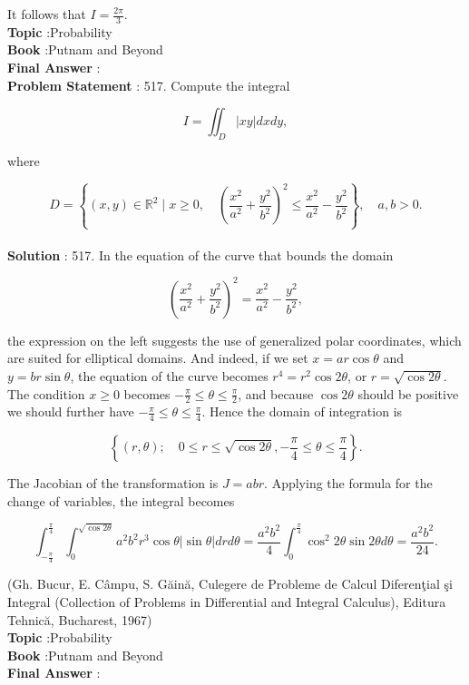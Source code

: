 \documentclass[10pt]{article}
\begin{document}
It follows that $I=\frac{2 \pi}{3}$.
\\
\textbf{Topic} :Probability\\
\textbf{Book} :Putnam and Beyond\\
\textbf{Final Answer} :\\


\textbf{Problem Statement} :
517. Compute the integral

$$
I=\iint_{D}|x y| d x d y,
$$

where

$$
D=\left\{(x, y) \in \mathbb{R}^{2} \mid x \geq 0, \quad\left(\frac{x^{2}}{a^{2}}+\frac{y^{2}}{b^{2}}\right)^{2} \leq \frac{x^{2}}{a^{2}}-\frac{y^{2}}{b^{2}}\right\}, \quad a, b>0 .
$$
\\
\textbf{Solution} :
517. In the equation of the curve that bounds the domain

$$
\left(\frac{x^{2}}{a^{2}}+\frac{y^{2}}{b^{2}}\right)^{2}=\frac{x^{2}}{a^{2}}-\frac{y^{2}}{b^{2}},
$$

the expression on the left suggests the use of generalized polar coordinates, which are suited for elliptical domains. And indeed, if we set $x=a r \cos \theta$ and $y=b r \sin \theta$, the equation of the curve becomes $r^{4}=r^{2} \cos 2 \theta$, or $r=\sqrt{\cos 2 \theta}$. The condition $x \geq 0$ becomes $-\frac{\pi}{2} \leq \theta \leq \frac{\pi}{2}$, and because $\cos 2 \theta$ should be positive we should further have $-\frac{\pi}{4} \leq \theta \leq \frac{\pi}{4}$. Hence the domain of integration is

$$
\left\{(r, \theta) ; \quad 0 \leq r \leq \sqrt{\cos 2 \theta},-\frac{\pi}{4} \leq \theta \leq \frac{\pi}{4}\right\} .
$$

The Jacobian of the transformation is $J=a b r$. Applying the formula for the change of variables, the integral becomes

$$
\int_{-\frac{\pi}{4}}^{\frac{\pi}{4}} \int_{0}^{\sqrt{\cos 2 \theta}} a^{2} b^{2} r^{3} \cos \theta|\sin \theta| d r d \theta=\frac{a^{2} b^{2}}{4} \int_{0}^{\frac{\pi}{4}} \cos ^{2} 2 \theta \sin 2 \theta d \theta=\frac{a^{2} b^{2}}{24} .
$$

(Gh. Bucur, E. Câmpu, S. Găină, Culegere de Probleme de Calcul Diferenţial şi Integral (Collection of Problems in Differential and Integral Calculus), Editura Tehnică, Bucharest, 1967)
\\
\textbf{Topic} :Probability\\
\textbf{Book} :Putnam and Beyond\\
\textbf{Final Answer} :\\
\end{document}
